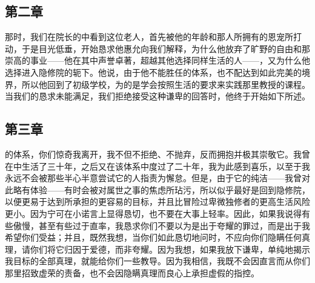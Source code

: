 
\subsection{第二章}

\par

那时，我们在院长的中看到这位老人，首先被他的年龄和那人所拥有的恩宠所打动，于是目光低垂，开始恳求他惠允向我们解释，为什么他放弃了旷野的自由和那崇高的事业——他在其中声誉卓著，超越其他选择同样生活的人——，又为什么他选择进入隐修院的轭下。他说，由于他不能胜任的体系，也不配达到如此完美的境界，所以他回到了初级学校，为的是学会按照生活的要求来实践那里教授的课程。当我们的恳求未能满足，我们拒绝接受这种谦卑的回答时，他终于开始如下所述。\par


\subsection{第三章}

\par

的体系，你们惊奇我离开，我不但不拒绝、不抛弃，反而拥抱并极其崇敬它。我曾在中生活了三十年，之后又在该体系中度过了二十年，我为此感到喜乐，以至于我永远不会被那些半心半意尝试它的人指责为懈怠。但是，由于它的纯洁——我曾对此略有体验——有时会被对属世之事的焦虑所玷污，所以似乎最好是回到隐修院，以便更易于达到所承担的更容易的目标，并且比冒险过卑微独修者的更高生活风险更小。因为宁可在小诺言上显得恳切，也不要在大事上轻率。因此，如果我说得有些傲慢，甚至有些过于直率，我恳求你们不要以为是出于夸耀的罪过，而是出于我希望你们受益；并且，既然我想，当你们如此恳切地问时，不应向你们隐瞒任何真理，请你们将它归因于爱德，而非夸耀。因为我想，如果我放下谦卑，单纯地揭示我目标的全部真理，就能给你们一些教导。因为我相信，我既不会因直言而从你们那里招致虚荣的责备，也不会因隐瞒真理而良心上承担虚假的指控。\par


